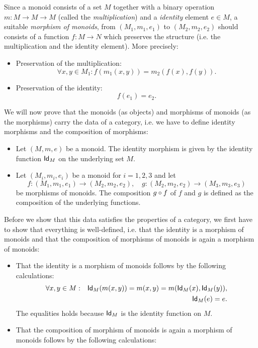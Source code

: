 \begin{solution}\label{sol:category_of_monoids}
Since a monoid consists of a set $M$ together with a binary operation $m:M\to M\to M$ (called the \textit{multiplication}) and a \textit{identity} element $e\in M$, a suitable \textit{morphism of monoids}, from $(M_1,m_1,e_1)$ to $(M_2,m_2,e_2)$ should consists of a function $f:M\to N$ which preserves the structure (i.e. the multiplication and the identity element). More precisely:
\begin{itemize}
\item Preservation of the multiplication:
\[
\forall x,y\in M_1: f(m_1(x,y)) = m_2(f(x), f(y)).
\]
\item Preservation of the identity:
\[
f(e_1) = e_2.
\]
\end{itemize}
We will now prove that the monoids (as objects) and morphisms of monoids (as the morphisms) carry the data of a category, i.e. we have to define identity morphisms and the composition of morphisms:
\begin{itemize}
\item Let $(M,m,e)$ be a monoid. The identity morphism is given by the identity function $\Id[M]$ on the underlying set $M$. 
\item Let $(M_i,m_i,e_i)$ be a monoid for $i=1,2,3$ and let 
\[ 
f:(M_1,m_1,e_1)\to (M_2,m_2,e_2),\quad g:(M_2,m_2,e_2)\to (M_3,m_3,e_3)
\] 
be morphisms of monoids. The composition $\co{f}{g}$ of $f$ and $g$ is defined as the composition of the underlying functions.
\end{itemize}
Before we show that this data satisfies the properties of a category, we first have to show that everything is well-defined, i.e. that the identity is a morphism of monoids and that the composition of morphisms of monoids is again a morphism of monoids:
\begin{itemize}
\item That the identity is a morphism of monoids follows by the following calculations:
\begin{eqnarray*}
\forall x,y\in M &:& \Id[M](m(x,y)) = m(x,y) = m(\Id[M](x),\Id[M](y)),\\
&& \Id[M](e) = e.
\end{eqnarray*}
The equalities holds because $\Id[M]$ is the identity function on $M$.
\item That the composition of morphism of monoids is again a morphism of monoids follows by the following calculations:
\begin{itemize}

\end{itemize}
\end{itemize}
\end{solution}
